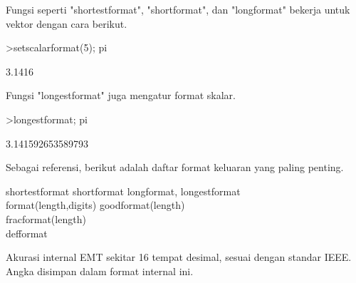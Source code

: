 \documentclass[a4paper,10pt]{article}
\begin{document}
\begin{eulernotebook}
\begin{eulercomment}
\begin{eulercomment}
\begin{eulercomment}
\begin{eulercomment}
\begin{eulercomment}
Fungsi seperti "shortestformat", "shortformat", dan "longformat"
bekerja untuk vektor dengan cara berikut.
\end{eulercomment}
\begin{eulerprompt}
>setscalarformat(5); pi
\end{eulerprompt}
\begin{euleroutput}
  3.1416
\end{euleroutput}
\begin{eulercomment}
Fungsi "longestformat" juga mengatur format skalar.
\end{eulercomment}
\begin{eulerprompt}
>longestformat; pi
\end{eulerprompt}
\begin{euleroutput}
  3.141592653589793
\end{euleroutput}
\begin{eulercomment}
Sebagai referensi, berikut adalah daftar format keluaran yang paling
penting.

shortestformat shortformat longformat, longestformat \\
format(length,digits) goodformat(length)\\
fracformat(length)\\
defformat

Akurasi internal EMT sekitar 16 tempat desimal, sesuai dengan standar
IEEE. Angka disimpan dalam format internal ini. 


\end{eulercomment}
\end{eulercomment}
\end{eulercomment}
\end{eulercomment}
\end{eulercomment}
\end{eulernotebook}
\end{document}
